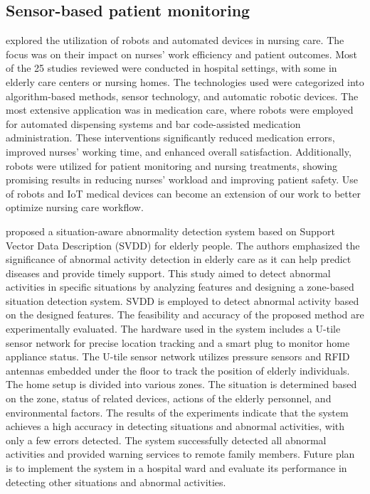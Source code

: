 \subsection{Sensor-based patient monitoring}
\cite{robot-impact} explored the utilization of robots and automated devices in nursing care. The focus was on their impact on nurses' work efficiency and patient outcomes. Most of the 25 studies reviewed were conducted in hospital settings, with some in elderly care centers or nursing homes. The technologies used were categorized into algorithm-based methods, sensor technology, and automatic robotic devices. The most extensive application was in medication care, where robots were employed for automated dispensing systems and bar code-assisted medication administration. These interventions significantly reduced medication errors, improved nurses' working time, and enhanced overall satisfaction. Additionally, robots were utilized for patient monitoring and nursing treatments, showing promising results in reducing nurses' workload and improving patient safety. Use of robots and IoT medical devices can become an extension of our work to better optimize nursing care workflow.

\cite{Study7} proposed a situation-aware abnormality detection system based on Support Vector Data Description (SVDD) for elderly people. The authors emphasized the significance of abnormal activity detection in elderly care as it can help predict diseases and provide timely support. This study aimed to detect abnormal activities in specific situations by analyzing features and designing a zone-based situation detection system. SVDD is employed to detect abnormal activity based on the designed features. The feasibility and accuracy of the proposed method are experimentally evaluated.
The hardware used in the system includes a U-tile sensor network for precise location tracking and a smart plug to monitor home appliance status. The U-tile sensor network utilizes pressure sensors and RFID antennas embedded under the floor to track the position of elderly individuals. The home setup is divided into various zones. The situation is determined based on the zone, status of related devices, actions of the elderly personnel, and environmental factors. The results of the experiments indicate that the system achieves a high accuracy in detecting situations and abnormal activities, with only a few errors detected. The system successfully detected all abnormal activities and provided warning services to remote family members. Future plan is to implement the system in a hospital ward and evaluate its performance in detecting other situations and abnormal activities.

